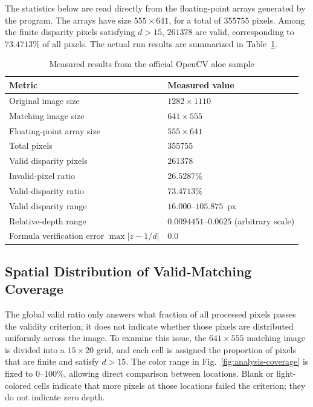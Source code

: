 The statistics below are read directly from the floating-point arrays generated by the program.
The arrays have size $555\times641$, for a total of $355755$ pixels. Among the finite disparity
pixels satisfying $d>15$, $261378$ are valid, corresponding to $73.4713\%$ of all pixels.
The actual run results are summarized in Table~\ref{tab:result-statistics}.

\begin{table}[H]
  \centering
  \caption{Measured results from the official OpenCV aloe sample}
  \label{tab:result-statistics}
  \begin{tabular}{ll}
    \toprule
    Metric & Measured value \\
    \midrule
    Original image size & $1282\times1110$ \\
    Matching image size & $641\times555$ \\
    Floating-point array size & $555\times641$ \\
    Total pixels & $355755$ \\
    Valid disparity pixels & $261378$ \\
    Invalid-pixel ratio & $26.5287\%$ \\
    Valid-disparity ratio & $73.4713\%$ \\
    Valid disparity range & $16.000$--$105.875$~px \\
    Relative-depth range & $0.0094451$--$0.0625$ (arbitrary scale) \\
    Formula verification error $\max|z-1/d|$ & $0.0$ \\
    \bottomrule
  \end{tabular}
\end{table}

\subsection{Spatial Distribution of Valid-Matching Coverage}

The global valid ratio only answers what fraction of all processed pixels passes the validity
criterion; it does not indicate whether those pixels are distributed uniformly across the image.
To examine this issue, the $641\times555$ matching image is divided into a $15\times20$ grid, and
each cell is assigned the proportion of pixels that are finite and satisfy $d>15$. The color range
in Fig.~\ref{fig:analysis-coverage} is fixed to 0--100\%, allowing direct comparison between
locations. Blank or light-colored cells indicate that more pixels at those locations failed the
criterion; they do not indicate zero depth.

